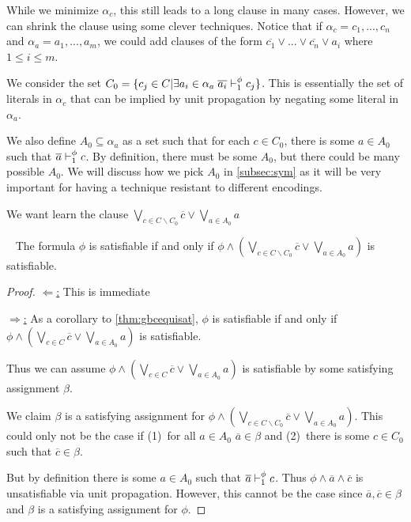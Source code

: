 While we minimize $\alpha_c$, this still leads to a long clause in many cases. However, we can shrink the clause using some clever techniques. Notice that if $\alpha_c = c_1, ..., c_n$ and $\alpha_a = a_1, ..., a_m$, we could add clauses of the form $\overline{c_1} \lor ... \lor \overline{c_n} \lor a_i$ where $1 \leq i \leq m$.


We consider the set $C_0 = \{c_j \in C| \exists a_i \in \alpha_a \; \overline{a_i} \vdash_1^\phi c_j \}$. This is essentially the set of literals in $\alpha_c$ that can be implied by unit propagation by negating some literal in $\alpha_a$.

We also define $A_0 \subseteq \alpha_a$ as a set such that for each $c \in C_0$, there is some $a \in A_0$ such that $\overline{a} \vdash_1^\phi c$. By definition, there must be some $A_0$, but there could be many possible $A_0$. We will discuss how we pick $A_0$ in \autoref{subsec:sym} as it will be very important for having a technique resistant to different encodings. 



We want learn the clause $\bigvee_{c \in C \backslash C_0} \overline{c} \lor \bigvee_{a \in A_0} a$


\begin{theorem}~\label{thm:shrunkgbcequisat}
    The formula $\phi$ is satisfiable if and only if $\phi \land (\bigvee_{c \in C \backslash C_0} \overline{c} \lor \bigvee_{a \in A_0} a)$ is satisfiable.
\end{theorem}

\begin{proof}
    \underline{$\Leftarrow$:} This is immediate


    \underline{$\Rightarrow$:}  As a corollary to \autoref{thm:gbcequisat}, $\phi$ is satisfiable if and only if $\phi \land (\bigvee_{c \in C} \overline{c} \lor \bigvee_{a \in A_0} a)$ is satisfiable.

    Thus we can assume $\phi \land (\bigvee_{c \in C} \overline{c} \lor \bigvee_{a \in A_0} a)$ is satisfiable by some satisfying assignment $\beta$.

    We claim $\beta$ is a satisfying assignment for $\phi \land (\bigvee_{c \in C \backslash C_0} \overline{c} \lor \bigvee_{a \in A_0} a)$. This could only not be the case if (1)~for all $a \in A_0$ $\overline{a} \in \beta$ and (2)~there is some $c \in C_0$ such that $\overline{c} \in \beta$. 

    But by definition there is some $a \in A_0$ such that $\overline{a} \vdash_1^\phi c$. Thus $\phi \land \overline{a} \land \overline{c}$ is unsatisfiable via unit propagation. However, this cannot be the case since $\overline{a}, \overline{c} \in \beta$ and $\beta$ is a satisfying assignment for $\phi$.
\end{proof}

